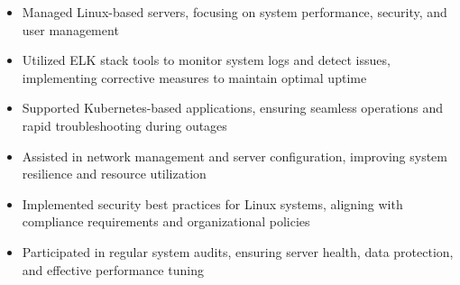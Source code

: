 \par\smallskip
\noindent
\begin{minipage}{20cm}
  \begin{minipage}{9.75cm}
    \begin{itemize}
      \item Managed Linux-based servers, focusing on system performance, security, and user management
      \item Utilized ELK stack tools to monitor system logs and detect issues, implementing corrective measures to maintain optimal uptime
      \item Supported Kubernetes-based applications, ensuring seamless operations and rapid troubleshooting during outages
    \end{itemize}
  \end{minipage}
  \hfill
  \begin{minipage}{9.75cm}
    \begin{itemize}
      \item Assisted in network management and server configuration, improving system resilience and resource utilization
      \item Implemented security best practices for Linux systems, aligning with compliance requirements and organizational policies
      \item Participated in regular system audits, ensuring server health, data protection, and effective performance tuning
    \end{itemize}
  \end{minipage}
\end{minipage}
\par\smallskip
\divider

